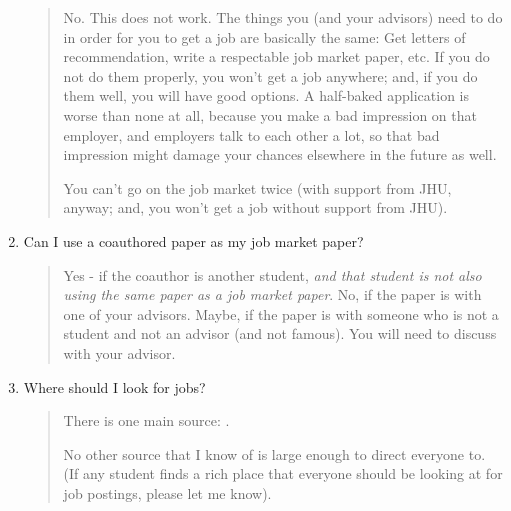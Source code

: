 \documentclass{\classes/econtex}
\begin{document}
\begin{enumerate}
  \begin{quote}
    No.  This does not work.  The things you (and your advisors) need to do in order for you to
    get a job are basically the same: Get letters of recommendation, 
    write a respectable job market paper, etc.  If you do not do them
    properly, you won't get a job anywhere; and, if you do them well,
    you will have good options.  A half-baked application is worse than
    none at all, because you make a bad impression on that employer, and 
    employers talk to each other a lot, so that bad impression might damage
    your chances elsewhere in the future as well.  

    You can't go on the job market twice (with support from JHU, anyway; and, you won't
    get a job without support from JHU).

  \end{quote}
\item  Can I use a coauthored paper as my job market paper?

  \begin{quote}
    Yes - if the coauthor is another student, \textit{and that student is not
    also using the same paper as a job market paper}.  No, if the paper is with one of your
    advisors.  Maybe, if the paper is with someone who is not a student
    and not an advisor (and not famous).  You will need to discuss with your advisor.
    \hypertarget{Where-Should-I-Look-for-Jobs}{}

  \end{quote}

\item  Where should I look for jobs? 

  \begin{quote}
    There is one main source: \JOE.

    No other source that I know of is large enough to direct everyone to. (If any student finds a rich place that everyone should be looking at for job postings, please let me know).

    \hypertarget{Region-Specific-Job-Markets}{}
    

\end{quote}
\end{enumerate}
\end{document}
